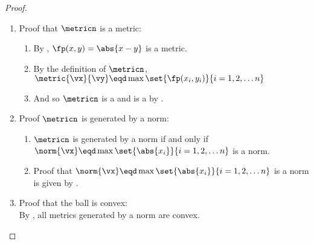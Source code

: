 \begin{proof}
\begin{enumerate}
  \item Proof that $\metricn$ is a metric:
    \begin{enumerate}
      \item By , $\fp(x,y)=\abs{x-y}$ is a metric.
      \item By the definition of $\metricn$, 
            $\metric{\vx}{\vy} \eqd \max\set{\fp(x_i,y_i)}{i=1,2,\ldots n}$
      \item And so $\metricn$ is a  and is a  by .
    \end{enumerate}

  \item Proof $\metricn$ is generated by a norm: 
    \begin{enumerate}
      \item $\metricn$ is generated by a norm if and only if
            $\norm{\vx}\eqd\max\set{\abs{x_i}}{i=1,2,\ldots n}$ is a norm.
      \item Proof that $\norm{\vx}\eqd\max\set{\abs{x_i}}{i=1,2,\ldots n}$ is a norm
            is given by .
    \end{enumerate}

  \item Proof that the ball is convex: \\
    By , all metrics generated by a norm are convex.
\end{enumerate}
\end{proof}




